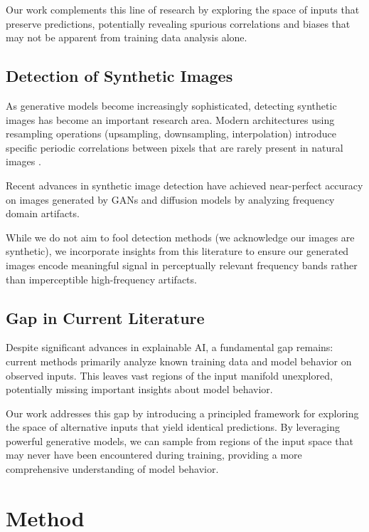 \documentclass[licencjacka,en]{pracamgr}
\begin{document}
Our work complements this line of research by exploring the space of inputs that preserve predictions, potentially revealing spurious correlations and biases that may not be apparent from training data analysis alone.

\section{Detection of Synthetic Images}

As generative models become increasingly sophisticated, detecting synthetic images has become an important research area. Modern architectures using resampling operations (upsampling, downsampling, interpolation) introduce specific periodic correlations between pixels that are rarely present in natural images \cite{Popescu2005ExposingDF}.

Recent advances in synthetic image detection \cite{zhang2019detectingsimulatingartifactsgan, wang2023dirediffusiongeneratedimagedetection, zhang2023diffusion} have achieved near-perfect accuracy on images generated by GANs and diffusion models by analyzing frequency domain artifacts.

While we do not aim to fool detection methods (we acknowledge our images are synthetic), we incorporate insights from this literature to ensure our generated images encode meaningful signal in perceptually relevant frequency bands rather than imperceptible high-frequency artifacts.

\section{Gap in Current Literature}

Despite significant advances in explainable AI, a fundamental gap remains: current methods primarily analyze known training data and model behavior on observed inputs. This leaves vast regions of the input manifold unexplored, potentially missing important insights about model behavior.

Our work addresses this gap by introducing a principled framework for exploring the space of alternative inputs that yield identical predictions. By leveraging powerful generative models, we can sample from regions of the input space that may never have been encountered during training, providing a more comprehensive understanding of model behavior.
\chapter{Method}\label{r:method}
\end{document}
